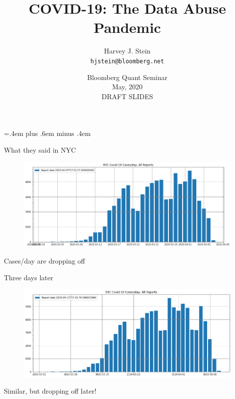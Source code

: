 \documentclass[aspectratio=169]{beamer}
\title{COVID-19: The Data Abuse Pandemic}
\author[Harvey J. Stein]{Harvey J. Stein\\\texttt{hjstein@bloomberg.net}}
\institute[Bloomberg LP]
{
  Head, Quantitative Risk Analytics\\
  Bloomberg L.P.
}
\date{Bloomberg Quant Seminar\\
  May, 2020\\
  DRAFT SLIDES}
\begin{document}
\nocite{nyc2020data,Stein2020nycdata,Stein2020owiddata,owid2020data}
\nocite{Stein2020Seem,Stein2020Ray,owid2020data,JHU2020data}
\nocite{NYT2020data}

\parskip=.4em plus .6em minus .4em

\begin{frame}

  \titlepage


\end{frame}

\begin{frame}{What they said in NYC}
  \begin{figure}
    \centering
    \includegraphics[width=1\textwidth]{../Notebooks/casesPerDay2020-04-07T17_52_37.000000000.png}
  \end{figure}
  Cases/day are dropping off
\end{frame}

\begin{frame}{Three days later}
  \begin{figure}
    \centering
    \includegraphics[width=1\textwidth]{../Notebooks/casesPerDay2020-04-10T17_41_39.000000000.png}
  \end{figure}
  Similar, but dropping off later!
\end{frame}
\end{document}
